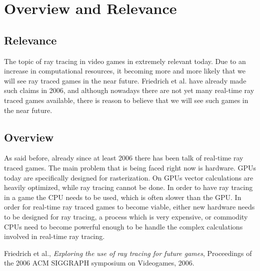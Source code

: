 \documentclass[a4paper]{article}
\begin{document}
\section{Overview and Relevance}

\subsection{Relevance}
The topic of ray tracing in video games in extremely relevant today. Due to an increase in computational resources, it becoming more and more likely that we will see ray traced games in the near future. Friedrich et al. have already made such claims in 2006, and although nowadays there are not yet many real-time ray traced games available, there is reason to believe that we will see such games in the near future. 

\subsection{Overview}
As said before, already since at least 2006 there has been talk of real-time ray traced games. The main problem that is being faced right now is hardware. GPUs today are specifically designed for rasterization. On GPUs vector calculations are heavily optimized, while ray tracing cannot be done. In order to have ray tracing in a game the CPU needs to be used, which is often slower than the GPU. In order for real-time ray traced games to become viable, either new hardware needs to be designed for ray tracing, a process which is very expensive, or commodity CPUs need to become powerful enough to be handle the complex calculations involved in real-time ray tracing. 

\renewcommand{\refname}{\section{References and Further Sources}}
\begin{thebibliography}{1}

  Friedrich et al.,
  \emph{Exploring the use of ray tracing for future games},
  Proceedings of the 2006 ACM SIGGRAPH symposium on Videogames,
  2006.

\end{thebibliography}
\end{document}
